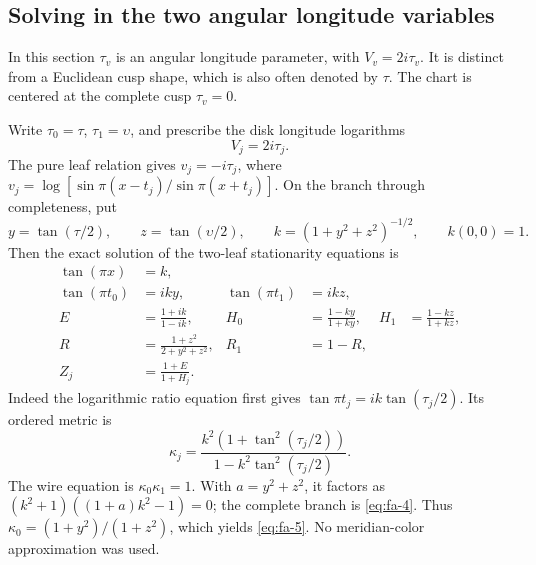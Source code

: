 \subsection{Solving in the two angular longitude variables}\label{sec:fa-2}

In this section \(\tau_v\) is an angular longitude parameter, with
\(V_v=2i\tau_v\). It is distinct from a Euclidean cusp shape, which
is also often denoted by \(\tau\). The chart is centered at the
complete cusp \(\tau_v=0\).

Write \(\tau_0=\tau\), \(\tau_1=\upsilon\), and prescribe the disk longitude logarithms
\begin{equation}
V_j=2i\tau_j.
\label{eq:fa-3}
\end{equation}
The pure leaf relation gives \(v_j=-i\tau_j\), where \(v_j=\log[\sin\pi(x-t_j)/\sin\pi(x+t_j)]\). On the branch through completeness, put
\begin{equation}
y=\tan(\tau/2),\qquad z=\tan(\upsilon/2),\qquad
 k=(1+y^2+z^2)^{-1/2},\qquad k(0,0)=1.
\label{eq:fa-4}
\end{equation}
Then the exact solution of the two-leaf stationarity equations is
\begin{equation}
\begin{aligned}
 \tan(\pi x)&=k,\\
 \tan(\pi t_0)&=iky,&
 \tan(\pi t_1)&=ikz,\\
 E&=\frac{1+ik}{1-ik},&
 H_0&=\frac{1-ky}{1+ky},&
 H_1&=\frac{1-kz}{1+kz},\\
 R&=\frac{1+z^2}{2+y^2+z^2},& R_1&=1-R,\\
 Z_j&=\frac{1+E}{1+H_j}.
\end{aligned}
\label{eq:fa-5}
\end{equation}
Indeed the logarithmic ratio equation first gives \(\tan\pi t_j=ik\tan(\tau_j/2)\). Its ordered metric is
\begin{equation}
\kappa_j=\frac{k^2(1+\tan^2(\tau_j/2))}
                       {1-k^2\tan^2(\tau_j/2)}.
\label{eq:fa-6}
\end{equation}
The wire equation is \(\kappa_0\kappa_1=1\). With \(a=y^2+z^2\), it factors as \((k^2+1)((1+a)k^2-1)=0\); the complete branch is \eqref{eq:fa-4}. Thus \(\kappa_0=(1+y^2)/(1+z^2)\), which yields \eqref{eq:fa-5}. No meridian-color approximation was used.

